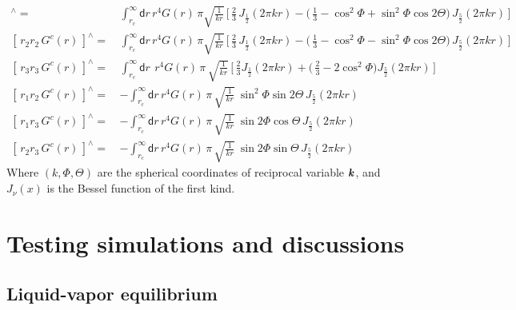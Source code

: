 \documentclass[aps,pre,preprint]{revtex4-1}
\renewcommand{\v}[1]{\textbf{\textit{#1}}}
\renewcommand{\d}[1]{\textsf{#1}}
\begin{document}
\begin{align}
  [\,r_1r_1\,G^c(r)\,]^{\wedge} 
  =\,& 
  \int_{r_c}^\infty \d dr\, r^4 G(r)\,
  \pi \sqrt{ \frac1{kr} }\,
  \Big[\,
  \frac23\,J_{\frac12}(2\pi kr) -
  \big(\,
  \frac13 -
  \cos^2\Phi +
  \sin^2\Phi\cos2\Theta
  \big)\, J_{\frac52}(2\pi kr)
  \,\Big] \\
  [\,r_2 r_2\,G^c(r)\,]^{\wedge} 
  =\,& 
  \int_{r_c}^\infty \d dr\, r^4 G(r)\,
  \pi \sqrt{ \frac1{kr} }\,
  \Big[\,
  \frac23\,J_{\frac12}(2\pi kr) -
  \big(\,
  \frac13 -
  \cos^2\Phi -
  \sin^2\Phi\cos2\Theta
  \big)\, J_{\frac52}(2\pi kr)
  \,\Big]   \\
  [\,r_3 r_3\,G^c(r)\,]^{\wedge} 
  =\,& 
  \int_{r_c}^\infty \d dr\: \,r^4 G(r)\,\pi\,
  \sqrt{ \frac1{kr} }\,
  \Big[\,
  \frac23 J_{\frac12}(2\pi kr) +
  \big(\,
  \frac23 - 2\cos^2\Phi
  \big)
  J_{\frac52}(2\pi kr)
  \,\Big]\\
  [\,r_1 r_2\,G^c(r)\,]^{\wedge} 
  =\,& -
  \int_{r_c}^\infty
  \d dr\,
  r^4G(r)\,\pi\,
  \sqrt{\frac1{kr}}\:
  \sin^2\Phi\sin 2\Theta\,J_{\frac52}(2\pi kr)\\
  [\,r_1 r_3\,G^c(r)\,]^{\wedge} 
  =\,& -
  \int_{r_c}^\infty
  \d dr\,
  r^4G(r)\,\pi\,
  \sqrt{\frac1{kr}}\:
  \sin2\Phi\cos\Theta\,J_{\frac52}(2\pi kr)\\
  [\,r_2 r_3\,G^c(r)\,]^{\wedge} 
  =\,& -
  \int_{r_c}^\infty
  \d dr\,
  r^4G(r)\,\pi\,
  \sqrt{\frac1{kr}}\:
  \sin2\Phi\sin\Theta\,J_{\frac52}(2\pi kr)
\end{align}
Where $(k, \Phi, \Theta)$ are the spherical coordinates of reciprocal
variable $\v k$, and $J_\nu(x)$ is the Bessel function of the first
kind.



\section{Testing simulations and discussions}\label{sec:tmp2}

\subsection{Liquid-vapor equilibrium}\label{sec:tmp2.1}
\end{document}

